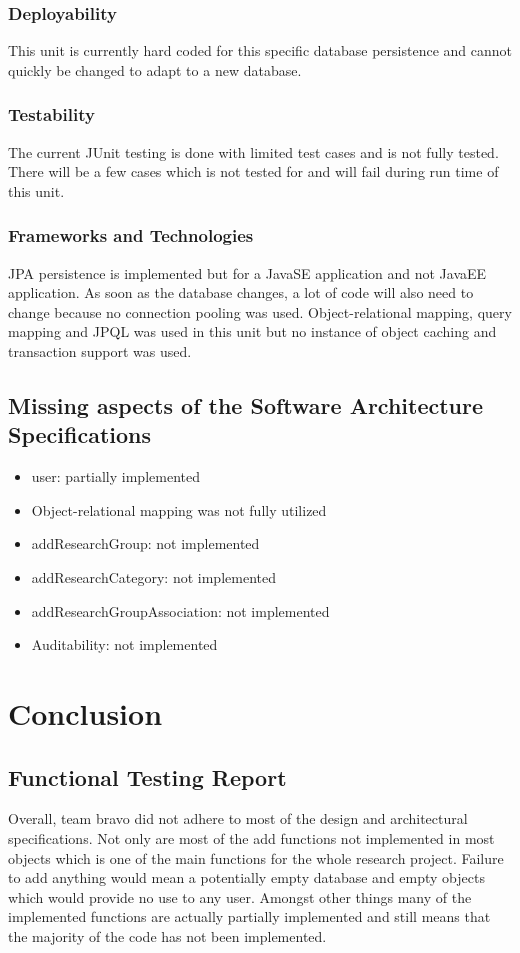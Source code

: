 \documentclass{article}
\begin{document}
	\subsubsection{Deployability}
	This unit is currently hard coded for this specific database persistence and cannot quickly be changed to adapt to a new database.
	
	\subsubsection{Testability}
	The current JUnit testing is done with limited test cases and is not fully tested. There will be a few cases which is not tested for and will fail during run time of this unit.
	
	\subsubsection{Frameworks and Technologies}
	JPA persistence is implemented but for a JavaSE application and not JavaEE application. As soon as the database changes, a lot of code will also need to change because no connection pooling was used. Object-relational mapping, query mapping and JPQL was used in this unit but no instance of object caching and transaction support was used.

     \subsection{Missing aspects of the Software Architecture Specifications}
	\begin{itemize}
		\item user: partially implemented
		\item Object-relational mapping was not fully utilized
		\item addResearchGroup: not implemented
		\item addResearchCategory: not implemented
		\item addResearchGroupAssociation: not implemented
		\item Auditability: not implemented
	\end{itemize}

\section{Conclusion}
\subsection{Functional Testing Report}
Overall, team bravo did not adhere to most of the design and architectural specifications. Not only are most of the add functions not implemented in most objects which is one of the main functions for the whole research project. Failure to add anything would mean a potentially empty database and empty objects which would provide no use to any user. Amongst other things many of the implemented functions are actually partially implemented and still means that the majority of the code has not been implemented.
\end{document}
